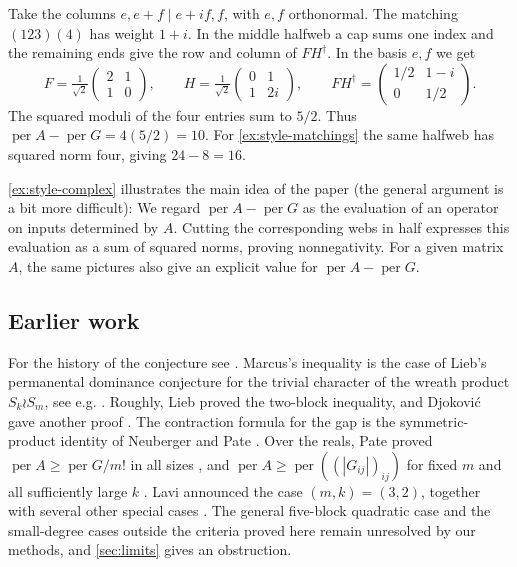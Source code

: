 \documentclass[a4paper,11pt]{amsart}
\numberwithin{equation}{subsection}
\theoremstyle{plain}
\theoremstyle{definition}
\newcommand{\per}{\operatorname{per}}
\begin{document}
\begin{example}\label{ex:style-complex}
Take the columns $e,e+f\mid e+if,f$, with $e,f$ orthonormal. The matching $(123)(4)$ has weight $1+i$. In the middle halfweb a cap sums one index and the remaining ends give the row and column of $FH^\dagger$. In the basis $e,f$ we get
\[
F=\tfrac1{\sqrt2}\begin{pmatrix}2&1\\1&0\end{pmatrix},\qquad
H=\tfrac1{\sqrt2}\begin{pmatrix}0&1\\1&2i\end{pmatrix},\qquad
FH^\dagger=\begin{pmatrix}1/2&1-i\\0&1/2\end{pmatrix}.
\]
The squared moduli of the four entries sum to $5/2$. Thus $\per A-\per G=4(5/2)=10$. For \autoref{ex:style-matchings} the same halfweb has squared norm four, giving $24-8=16$.
\end{example}

\autoref{ex:style-complex} illustrates the main idea of the paper (the general argument is a bit more difficult):
We regard $\per A-\per G$ as the evaluation of an operator on inputs determined by $A$.
Cutting the corresponding webs in half expresses this evaluation as a sum of squared norms, proving nonnegativity.
For a given matrix $A$, the same pictures also give an explicit value for $\per A-\per G$.

\subsection{Earlier work}

For the history of the conjecture see \cite[Conjecture~9]{CheonWanless}. Marcus's inequality is the case of Lieb's permanental dominance conjecture for the trivial character of the wreath product $S_k\wr S_m$, see e.g. \cite[Conjecture~3]{Wanless}. Roughly, 
Lieb proved the two-block inequality, and Djokovi\'c gave another proof \cite{Lieb,Djokovic}. The contraction formula for the gap is the symmetric-product identity of Neuberger and Pate \cite{Neuberger,Pate}. Over the reals, Pate proved $\per A\ge\per G/m!$ in all sizes \cite{Pate1981}, and $\per A\ge\per((|G_{ij}|)_{ij})$ for fixed $m$ and all sufficiently large $k$ \cite{Pate1982}. Lavi announced the case $(m,k)=(3,2)$, together with several other special cases \cite{Lavi}. The general five-block quadratic case and the small-degree cases
outside the criteria proved here remain unresolved by our methods, and
\autoref{sec:limits} gives an obstruction.
\end{document}
